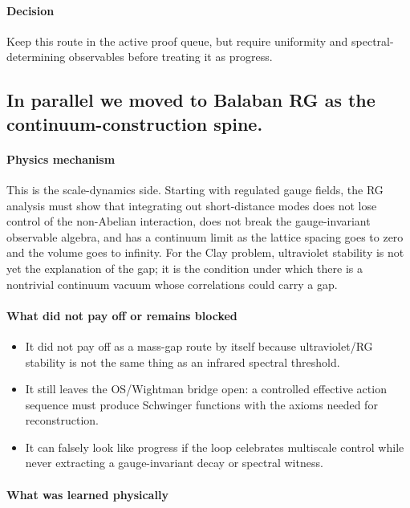 \documentclass[11pt]{article}
\begin{document}
\paragraph{Decision}

Keep this route in the active proof queue, but require uniformity and spectral-determining observables before treating it as progress.

\subsection*{In parallel we moved to Balaban RG as the continuum-construction spine.}

\paragraph{Physics mechanism}

This is the scale-dynamics side. Starting with regulated gauge fields, the RG analysis must show that integrating out short-distance modes does not lose control of the non-Abelian interaction, does not break the gauge-invariant observable algebra, and has a continuum limit as the lattice spacing goes to zero and the volume goes to infinity. For the Clay problem, ultraviolet stability is not yet the explanation of the gap; it is the condition under which there is a nontrivial continuum vacuum whose correlations could carry a gap.

\paragraph{What did not pay off or remains blocked}

\begin{itemize}
\item It did not pay off as a mass-gap route by itself because ultraviolet/RG stability is not the same thing as an infrared spectral threshold.
\item It still leaves the OS/Wightman bridge open: a controlled effective action sequence must produce Schwinger functions with the axioms needed for reconstruction.
\item It can falsely look like progress if the loop celebrates multiscale control while never extracting a gauge-invariant decay or spectral witness.
\end{itemize}

\paragraph{What was learned physically}
\end{document}
